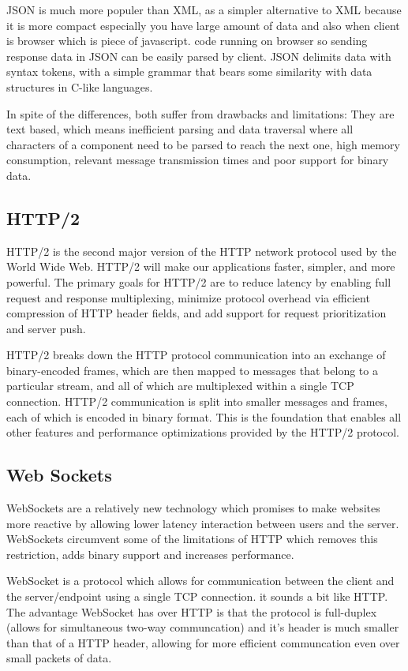 \documentclass[runningheads,a4paper]{llncs}
\begin{document}
JSON is much more populer than XML\cite{state6}, as a simpler alternative to XML because it is more compact especially you have large amount of data and also when client is browser which is piece of javascript. code running on browser so sending response data in JSON can be easily parsed by client. JSON delimits data with syntax tokens, with a simple grammar that bears some similarity with data structures in C-like languages.

In spite of the differences, both suffer from drawbacks and limitations: They are text based, which means inefficient parsing and data traversal where all characters of a component need to be parsed to reach the next one, high memory consumption, relevant message transmission times and poor support for binary data.
\subsection{HTTP/2}

HTTP/2 is the second major version of the HTTP network protocol used by the World Wide Web. HTTP/2 will make our applications faster, simpler, and more powerful. The primary goals for HTTP/2 are to reduce latency by enabling full request and response multiplexing, minimize protocol overhead via efficient compression of HTTP header fields, and add support for request prioritization and server push\cite{state10}.

HTTP/2 breaks down the HTTP protocol communication into an exchange of binary-encoded frames, which are then mapped to messages that belong to a particular stream, and all of which are multiplexed within a single TCP connection. HTTP/2 communication is split into smaller messages and frames, each of which is encoded in binary format. This is the foundation that enables all other features and performance optimizations provided by the HTTP/2 protocol.


\subsection{Web Sockets}

WebSockets\cite{matching} are a relatively new technology which promises to make websites more reactive by allowing lower latency interaction between users and the server. WebSockets circumvent some of the limitations of HTTP which removes this restriction, adds binary support and increases performance.

WebSocket is a protocol which allows for communication between the client and the server/endpoint using a single TCP connection. it sounds a bit like HTTP. The advantage WebSocket has over HTTP is that the protocol is full-duplex (allows for simultaneous two-way communcation) and it’s header is much smaller than that of a HTTP header, allowing for more efficient communcation even over small packets of data.
\end{document}
